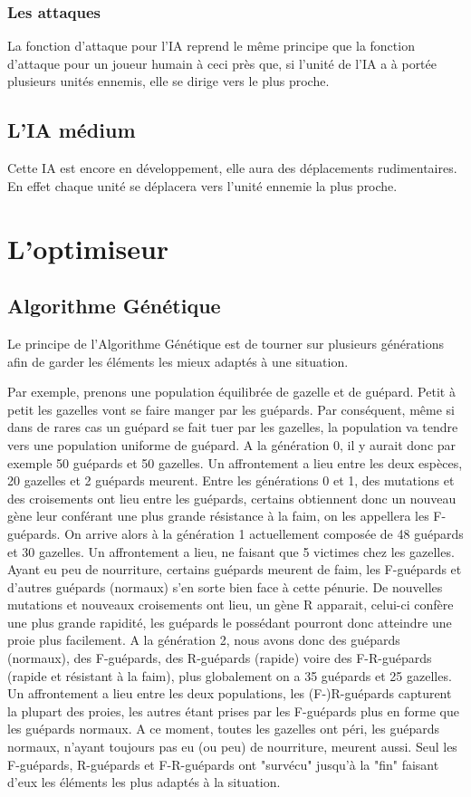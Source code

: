 \documentclass{article}
\begin{document}
  \subsubsection{Les attaques} 
 La fonction d'attaque pour l'IA reprend le même principe que la fonction d'attaque pour un joueur humain à ceci près que, si l'unité de l'IA a à portée plusieurs unités ennemis, elle se dirige vers le plus proche. 
 
 \subsection{L'IA médium}
 Cette IA est encore en développement, elle aura des déplacements rudimentaires. En effet chaque unité se déplacera vers l'unité ennemie la plus proche.
 
\section{L'optimiseur}

	\subsection{Algorithme Génétique}
		Le principe de l'Algorithme Génétique est de tourner sur plusieurs générations afin de garder les éléments les mieux adaptés à une situation.
		
		Par exemple, prenons une population équilibrée de gazelle et de guépard. Petit à petit les gazelles vont se faire manger par les guépards. Par conséquent, même si dans de rares cas un guépard se fait tuer par les gazelles, la population va tendre vers une population uniforme de guépard. A la génération 0, il y aurait donc par exemple 50 guépards et 50 gazelles. Un affrontement a lieu entre les deux espèces, 20 gazelles et 2 guépards meurent. Entre les générations 0 et 1, des mutations et des croisements ont lieu entre les guépards, certains obtiennent donc un nouveau gène leur conférant une plus grande résistance à la faim, on les appellera les F-guépards. On arrive alors à la génération 1 actuellement composée de 48 guépards et 30 gazelles. Un affrontement a lieu, ne faisant que 5 victimes chez les gazelles. Ayant eu peu de nourriture, certains guépards meurent de faim, les F-guépards et d'autres guépards (normaux) s'en sorte bien face à cette pénurie. De nouvelles mutations et nouveaux croisements ont lieu, un gène R apparait, celui-ci confère une plus grande rapidité, les guépards le possédant pourront donc atteindre une proie plus facilement. A la génération 2, nous avons donc des guépards (normaux), des F-guépards, des R-guépards (rapide) voire des F-R-guépards (rapide et résistant à la faim), plus globalement on a 35 guépards et 25 gazelles. Un affrontement a lieu entre les deux populations, les (F-)R-guépards capturent la plupart des proies, les autres étant prises par les F-guépards plus en forme que les guépards normaux. A ce moment, toutes les gazelles ont péri, les guépards normaux, n'ayant toujours pas eu (ou peu) de nourriture, meurent aussi. Seul les F-guépards, R-guépards et F-R-guépards ont "survécu" jusqu'à la "fin" faisant d'eux les éléments les plus adaptés à la situation.
		
\end{document}

